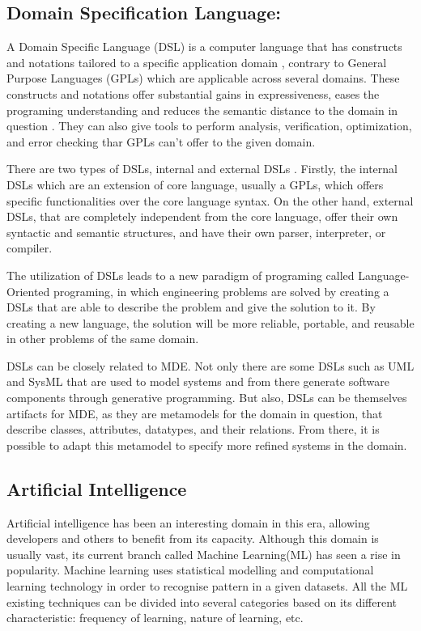 \subsection{Domain Specification Language:}

A Domain Specific Language (DSL) is a computer language that has constructs and notations tailored to a specific application domain \cite{DSL}, contrary to General Purpose Languages (GPLs) which are applicable across several domains. These constructs and notations offer substantial gains in expressiveness, eases the programing understanding and reduces the semantic distance to the domain in question \cite{DSLwhenwhere}. They can also give tools to perform analysis, verification, optimization, and error checking thar GPLs can’t offer to the given domain.

There are two types of DSLs, internal and external DSLs \cite{usabilityDSL}. Firstly, the internal DSLs which are an extension of core language, usually a GPLs, which offers specific functionalities over the core language syntax.  On the other hand, external DSLs, that are completely independent from the core language, offer their own syntactic and semantic structures, and have their own parser, interpreter, or compiler.

The utilization of DSLs leads to a new paradigm of programing called Language-Oriented programing, in which engineering problems are solved by creating a DSLs that are able to describe the problem and give the solution to it. By creating a new language, the solution will be more reliable, portable, and reusable in other problems of the same domain.

DSLs can be closely related to MDE. Not only there are some DSLs such as UML and SysML that are used to model systems and from there generate software components through generative programming. But also, DSLs can be themselves artifacts for MDE, as they are metamodels for the domain in question, that describe classes, attributes, datatypes, and their relations. From there, it is possible to adapt this metamodel to specify more refined systems in the domain.




\subsection{Artificial Intelligence} 
Artificial intelligence has been an interesting domain in this era, allowing developers and others to benefit from its capacity. Although this domain is usually vast, its current branch called Machine Learning(ML) has seen a rise in popularity. Machine learning uses statistical modelling and computational learning technology in order to recognise pattern in a given datasets. All the ML existing techniques can be divided into several categories based on its different characteristic: frequency of learning, nature of learning, etc.

